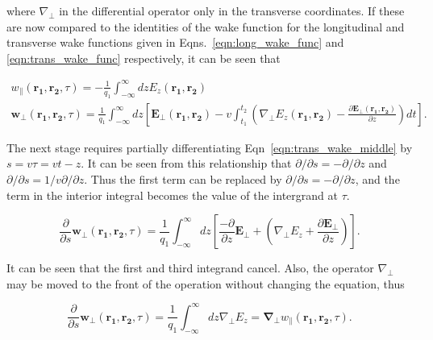 where $\nabla_{\perp}$ in the differential operator only in the transverse coordinates. If these are now compared to the identities of the wake function for the longitudinal and transverse wake functions given in Eqns.~\ref{eqn:long_wake_func} and \ref{eqn:trans_wake_func} respectively, it can be seen that

\begin{align}
w_{\parallel}\left( \mathbf{r_{1}}, \mathbf{r_{2}}, \tau   \right) = -\frac{1}{q_{1}} \int^{\infty}_{-\infty} dz E_{z} \left( \mathbf{r_{1}}, \mathbf{r_{2}} \right) \\
\mathbf{w}_{\perp} \left(\mathbf{r_{1}}, \mathbf{r_{2}}, \tau   \right) = \frac{1}{q_{1}} \int^{\infty}_{-\infty} dz \left[ \mathbf{E_{\perp}}\left(\mathbf{r_{1}}, \mathbf{r_{2}} \right) - v   \int^{t_{2}}_{t_{1}}\left(  \nabla_{\perp}E_{z}\left(\mathbf{r_{1}}, \mathbf{r_{2}} \right)  - \frac{\partial\mathbf{E}_{\perp}\left(\mathbf{r_{1}}, \mathbf{r_{2}} \right)}{\partial z} \right) dt \right] \label{eqn:trans_wake_middle}.
\end{align}

The next stage requires partially differentiating Eqn~\ref{eqn:trans_wake_middle} by $s = v \tau = vt - z$. It can be seen from this relationship that $\partial / \partial s = - \partial / \partial z$ and $\partial / \partial s = 1/v \partial / \partial z$. Thus the first term can be replaced by $\partial / \partial s = - \partial / \partial z$, and the term in the interior integral becomes the value of the intergrand at $\tau$.

\begin{equation}
\frac{\partial}{\partial s}\mathbf{w}_{\perp} \left(\mathbf{r_{1}}, \mathbf{r_{2}}, \tau   \right) = \frac{1}{q_{1}} \int^{\infty}_{-\infty} dz \left[ \frac{-\partial}{\partial z}\mathbf{E_{\perp}} + \left(  \nabla_{\perp}E_{z} + \frac{\partial\mathbf{E}_{\perp}}{\partial z} \right) \right].
\end{equation} 

It can be seen that the first and third integrand cancel. Also, the operator $\nabla_{\perp}$ may be moved to the front of the operation without changing the equation, thus

\begin{equation}
\frac{\partial}{\partial s}\mathbf{w}_{\perp} \left(\mathbf{r_{1}}, \mathbf{r_{2}}, \tau   \right) =  \frac{1}{q_{1}} \int^{\infty}_{-\infty} dz \nabla_{\perp}E_{z} = \mathbf{\nabla_{\perp}} w_{\parallel}\left( \mathbf{r_{1}}, \mathbf{r_{2}}, \tau   \right).
\end{equation}

